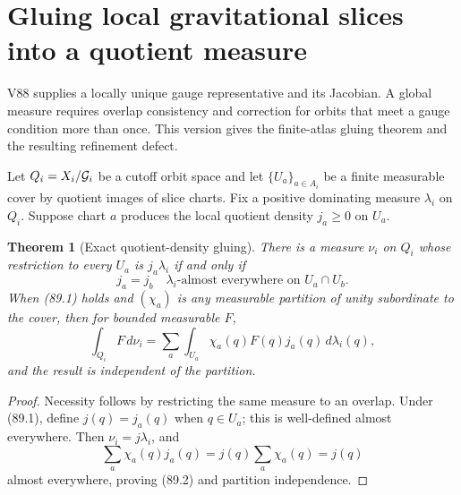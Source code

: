 \documentclass[11pt]{article}
\newtheorem{theorem}{Theorem}[section]
\begin{document}

\section{Gluing local gravitational slices into a quotient measure}
\label{sec:v11v89}

V88 supplies a locally unique gauge representative and its Jacobian.
A global measure requires overlap consistency and correction for
orbits that meet a gauge condition more than once.  This version gives
the finite-atlas gluing theorem and the resulting refinement defect.

Let \(Q_i=X_i/{\cal G}_i\) be a cutoff orbit space and let
\(\{U_a\}_{a\in A_i}\) be a finite measurable cover by quotient images
of slice charts.  Fix a positive dominating measure \(\lambda_i\) on
\(Q_i\).  Suppose chart \(a\) produces the local quotient density
\(j_a\ge0\) on \(U_a\).

\begin{theorem}[Exact quotient-density gluing]
\label{thm:v11v89-glue}
There is a measure \(\nu_i\) on \(Q_i\) whose restriction to every
\(U_a\) is \(j_a\lambda_i\) if and only if
\[
                              j_a=j_b
        \quad\lambda_i\text{-almost everywhere on }U_a\cap U_b.
                                                                    \tag{89.1}
\]
When (89.1) holds and \((\chi_a)\) is any measurable partition of
unity subordinate to the cover, then for bounded measurable \(F\),
\[
 \int_{Q_i}F\,d\nu_i
 =\sum_a\int_{U_a}\chi_a(q)F(q)j_a(q)\,d\lambda_i(q),        \tag{89.2}
\]
and the result is independent of the partition.
\end{theorem}

\begin{proof}
Necessity follows by restricting the same measure to an overlap.
Under (89.1), define \(j(q)=j_a(q)\) when \(q\in U_a\); this is
well-defined almost everywhere.  Then \(\nu_i=j\lambda_i\), and
\[
 \sum_a\chi_a(q)j_a(q)=j(q)\sum_a\chi_a(q)=j(q)
\]
almost everywhere, proving (89.2) and partition independence.
\end{proof}
\end{document}
